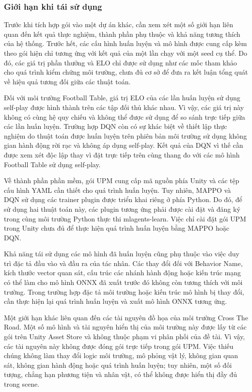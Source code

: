 \subsubsection{Giới hạn khi tái sử dụng}
\label{subsub:pkg-limitations}

\indent Trước khi tích hợp gói vào một dự án khác, cần xem xét một số giới hạn liên quan đến kết quả thực nghiệm, thành phần phụ thuộc và khả năng tương thích của hệ thống. Trước hết, các cấu hình huấn luyện và mô hình được cung cấp kèm theo gói hiện chỉ tương ứng với kết quả của một lần chạy với một seed cụ thể. Do đó, các giá trị phần thưởng và ELO chỉ được sử dụng như các mốc tham khảo cho quá trình kiểm chứng môi trường, chưa đủ cơ sở để đưa ra kết luận tổng quát về hiệu quả tương đối giữa các thuật toán.

\indent Đối với môi trường Football Table, giá trị ELO của các lần huấn luyện sử dụng self-play được hình thành trên các tập đối thủ khác nhau. Vì vậy, các giá trị này không có cùng hệ quy chiếu và không thể được sử dụng để so sánh trực tiếp giữa các lần huấn luyện. Trường hợp DQN còn có sự khác biệt về thiết lập thực nghiệm do thuật toán được huấn luyện trên phiên bản môi trường sử dụng không gian hành động rời rạc và không áp dụng self-play. Kết quả của DQN vì thế cần được xem xét độc lập thay vì đặt trực tiếp trên cùng thang đo với các mô hình Football Table sử dụng self-play.

\indent Về thành phần phần mềm, gói UPM cung cấp mã nguồn phía Unity và các tệp cấu hình YAML cần thiết cho quá trình huấn luyện. Tuy nhiên, MAPPO và DQN sử dụng các trainer plugin được triển khai riêng ở phía Python. Do đó, để sử dụng hai thuật toán này, các plugin tương ứng phải được cài đặt và đăng ký trong cùng môi trường Python thực thi mlagents-learn. Việc chỉ cài đặt gói UPM trong Unity chưa đủ để thực hiện quá trình huấn luyện bằng MAPPO hoặc DQN.

\indent Khả năng tái sử dụng các mô hình đã huấn luyện cũng phụ thuộc vào việc duy trì đặc tả đầu vào và đầu ra của tác nhân. Các thay đổi đối với Behavior Name, kích thước vector quan sát, cấu trúc các nhánh hành động hoặc kiến trúc mạng có thể làm cho mô hình ONNX đã xuất trước đó không còn tương thích với môi trường. Trong trường hợp đặc tả môi trường hoặc kiến trúc mô hình bị thay đổi, cần thực hiện lại quá trình huấn luyện và xuất mô hình ONNX tương ứng.

\indent Một giới hạn khác liên quan đến các tài nguyên đồ họa của môi trường Cross The Road. Một số mô hình và tài nguyên hiển thị của môi trường này được lấy từ các gói trên Unity Asset Store và không thuộc phạm vi phân phối của đề tài. Vì vậy, các tài nguyên này không được đóng gói trực tiếp trong gói UPM. Việc thiếu chúng không làm thay đổi logic môi trường, mô phỏng vật lý, không gian quan sát, không gian hành động hoặc quá trình huấn luyện; tuy nhiên, một số đối tượng, chẳng hạn phương tiện và nhân vật, có thể không được hiển thị đầy đủ trong scene.

